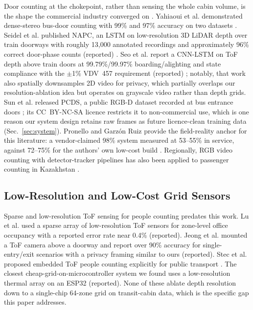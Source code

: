 \documentclass[conference]{IEEEtran}
\begin{document}
Door counting at the chokepoint, rather than sensing the whole cabin volume,
is the shape the commercial industry converged on \cite{irma,dilax}.
Yahiaoui et al. demonstrated dense-stereo bus-door counting with 99\% and 97\%
accuracy on two datasets \cite{yahiaoui2010}. Seidel et al. published NAPC, an
LSTM on low-resolution 3D LiDAR depth over train doorways with roughly 13{,}000
annotated recordings and approximately 96\% correct door-phase counts
(reported) \cite{seidel2021}. Seo et al. report a CNN-LSTM on ToF depth above
train doors at 99.79\%/99.97\% boarding/alighting and state compliance with
the $\pm$1\% VDV~457 requirement (reported) \cite{seo2026}; notably, that work
also spatially downsamples 2D video for privacy, which partially overlaps our
resolution-ablation idea but operates on grayscale video rather than depth
grids. Sun et al. released PCDS, a public RGB-D dataset recorded at bus
entrance doors \cite{sun2019}; its CC~BY-NC-SA licence restricts it to
non-commercial use, which is one reason our system design retains raw frames
as future licence-clean training data (Sec.~\ref{sec:system}). Pronello and
Garz\'on Ruiz provide the field-reality anchor for this literature: a
vendor-claimed 98\% system measured at 53--55\% in service, against 72--75\%
for the authors' own low-cost build \cite{pronello2023}. Regionally, RGB video
counting with detector-tracker pipelines has also been applied to passenger
counting in Kazakhstan \cite{nurseitov2026}.

\subsection{Low-Resolution and Low-Cost Grid Sensors}

Sparse and low-resolution ToF sensing for people counting predates this work.
Lu et al. used a sparse array of low-resolution ToF sensors for zone-level
office occupancy with a reported error rate near 0.4\% \cite{lu2021}
(reported). Jeong et al. mounted a ToF camera above a doorway and report over
90\% accuracy for single-entry/exit scenarios with a privacy framing similar
to ours \cite{jeong2025} (reported). Stec et al. proposed embedded ToF people
counting explicitly for public transport \cite{stec2019}. The closest
cheap-grid-on-microcontroller system we found uses a low-resolution thermal
array on an ESP32 \cite{papanashi2026} (reported). None of these ablate depth
resolution down to a single-chip 64-zone grid on transit-cabin data, which is
the specific gap this paper addresses.
\end{document}
